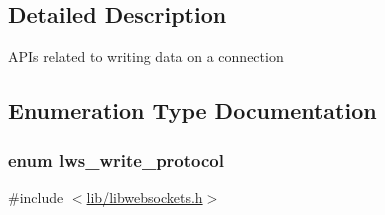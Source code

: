 \subsection{Detailed Description}
A\+P\+Is related to writing data on a connection 

\subsection{Enumeration Type Documentation}
\subsubsection[{\texorpdfstring{lws\+\_\+write\+\_\+protocol}{lws\_write\_protocol}}]{\setlength{\rightskip}{0pt plus 5cm}enum {\bf lws\+\_\+write\+\_\+protocol}}\hypertarget{group__sending-data_ga98b099cf8c1c7e38ad78501f270e193d}{}\label{group__sending-data_ga98b099cf8c1c7e38ad78501f270e193d}


{\ttfamily \#include $<$\hyperlink{libwebsockets_8h}{lib/libwebsockets.\+h}$>$}

